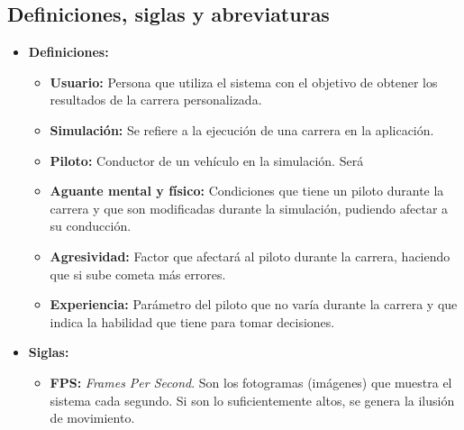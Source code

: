 \subsection{Definiciones, siglas y abreviaturas}

\begin{itemize}
    \item \textbf{Definiciones: }
        \begin{itemize}
            \item \textbf{Usuario: }Persona que utiliza el sistema con el objetivo de obtener los resultados de la carrera personalizada.
            \item \textbf{Simulación: }Se refiere a la ejecución de una carrera en la aplicación.
            \item \textbf{Piloto: }Conductor de un vehículo en la simulación. Será 
            \item \textbf{Aguante mental y físico: }Condiciones que tiene un piloto durante la carrera y que son modificadas durante la simulación, pudiendo afectar a su conducción.
            \item \textbf{Agresividad: }Factor que afectará al piloto durante la carrera, haciendo que si sube cometa más errores.
            \item \textbf{Experiencia: }Parámetro del piloto que no varía durante la carrera y que indica la habilidad que tiene para tomar decisiones.
        \end{itemize}
    \item \textbf{Siglas: }
    \begin{itemize}
        \item \textbf{FPS: }\textit{Frames Per Second}. Son los fotogramas (imágenes) que muestra el sistema cada segundo. Si son lo suficientemente altos, se genera la ilusión de movimiento.
    \end{itemize}
\end{itemize}




